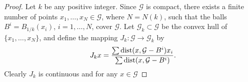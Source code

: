 \begin{proof}
Let $k$ be any positive integer. Since $\mathcal{G}$ is compact, there exists a finite number of points $x_1,\ldots,x_N \in \mathcal{G}$, where $N = N(k)$, such that the balls $B^i = B_{1/k}(x_i)$, $i = 1,\ldots,N$, cover $\mathcal{G}$. Let $\mathcal{G}_k \subset \mathcal{G}$ be the convex hull of $\{x_1,\ldots,x_N\}$, and define the mapping $J_k : \mathcal{G} \to \mathcal{G}_k$ by
\[
J_k x = \frac{\sum \operatorname{dist}(x,\mathcal{G}-B^i)x_i}{\sum \operatorname{dist}(x,\mathcal{G}-B^i)}.
\]
Clearly $J_k$ is continuous and for any $x \in \mathcal{G}$
\end{proof}
